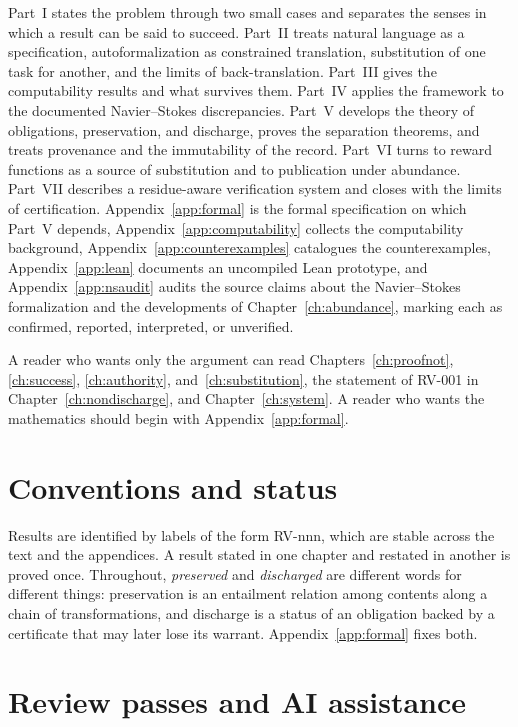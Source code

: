 Part~I states the problem through two small cases and separates the senses in which a result can be said to succeed. Part~II treats natural language as a specification, autoformalization as constrained translation, substitution of one task for another, and the limits of back-translation. Part~III gives the computability results and what survives them. Part~IV applies the framework to the documented Navier--Stokes discrepancies. Part~V develops the theory of obligations, preservation, and discharge, proves the separation theorems, and treats provenance and the immutability of the record. Part~VI turns to reward functions as a source of substitution and to publication under abundance. Part~VII describes a residue-aware verification system and closes with the limits of certification. Appendix~\ref{app:formal} is the formal specification on which Part~V depends, Appendix~\ref{app:computability} collects the computability background, Appendix~\ref{app:counterexamples} catalogues the counterexamples, Appendix~\ref{app:lean} documents an uncompiled Lean prototype, and Appendix~\ref{app:nsaudit} audits the source claims about the Navier--Stokes formalization and the developments of Chapter~\ref{ch:abundance}, marking each as confirmed, reported, interpreted, or unverified.

A reader who wants only the argument can read Chapters~\ref{ch:proofnot}, \ref{ch:success}, \ref{ch:authority}, and~\ref{ch:substitution}, the statement of RV-001 in Chapter~\ref{ch:nondischarge}, and Chapter~\ref{ch:system}. A reader who wants the mathematics should begin with Appendix~\ref{app:formal}.

\section*{Conventions and status}

Results are identified by labels of the form RV-nnn, which are stable across the text and the appendices. A result stated in one chapter and restated in another is proved once. Throughout, \emph{preserved} and \emph{discharged} are different words for different things: preservation is an entailment relation among contents along a chain of transformations, and discharge is a status of an obligation backed by a certificate that may later lose its warrant. Appendix~\ref{app:formal} fixes both.

\section*{Review passes and AI assistance}

